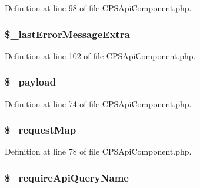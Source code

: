 Definition at line 98 of file CPSApiComponent.php.

\hypertarget{classCPSApiComponent_a15913094186791f856e0e5eb23883ba3}{
\subsubsection[{\$\_\-lastErrorMessageExtra}]{\setlength{\rightskip}{0pt plus 5cm}\$\_\-lastErrorMessageExtra}}
\label{classCPSApiComponent_a15913094186791f856e0e5eb23883ba3}


Definition at line 102 of file CPSApiComponent.php.

\hypertarget{classCPSApiComponent_a01bc135256923b2605138f01e3f81d76}{
\subsubsection[{\$\_\-payload}]{\setlength{\rightskip}{0pt plus 5cm}\$\_\-payload}}
\label{classCPSApiComponent_a01bc135256923b2605138f01e3f81d76}


Definition at line 74 of file CPSApiComponent.php.

\hypertarget{classCPSApiComponent_ae2824a887a5fbea2092a494eac8471bb}{
\subsubsection[{\$\_\-requestMap}]{\setlength{\rightskip}{0pt plus 5cm}\$\_\-requestMap}}
\label{classCPSApiComponent_ae2824a887a5fbea2092a494eac8471bb}


Definition at line 78 of file CPSApiComponent.php.

\hypertarget{classCPSApiComponent_ab068ac6d8ffe672d108a88b51f766294}{
\subsubsection[{\$\_\-requireApiQueryName}]{\setlength{\rightskip}{0pt plus 5cm}\$\_\-requireApiQueryName}}
\label{classCPSApiComponent_ab068ac6d8ffe672d108a88b51f766294}


